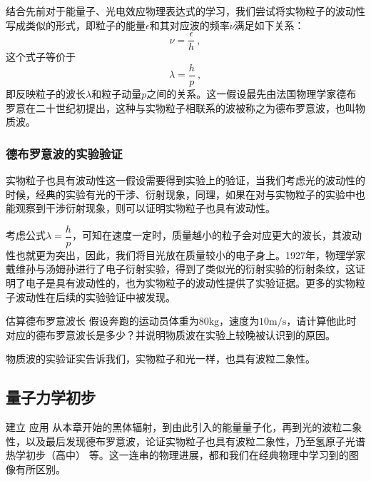 结合先前对于能量子、光电效应物理表达式的学习，我们尝试将实物粒子的波动性写成类似的形式，即粒子的能量$\epsilon$和其对应波的频率$\nu$满足如下关系：
$$\nu=\dfrac{\epsilon}{h}~,$$这个式子等价于$$\lambda=\dfrac{h}{p}~,$$即反映粒子的波长$\lambda$和粒子动量$p$之间的关系。这一假设最先由法国物理学家德布罗意在二十世纪初提出，这种与实物粒子相联系的波被称之为德布罗意波，也叫物质波。

\subsubsection{德布罗意波的实验验证}
实物粒子也具有波动性这一假设需要得到实验上的验证，当我们考虑光的波动性的时候，经典的实验有光的干涉、衍射现象，同理，如果在对与实物粒子的实验中也能观察到干涉衍射现象，则可以证明实物粒子也具有波动性。

考虑公式$\lambda=\dfrac{h}{p}$，可知在速度一定时，质量越小的粒子会对应更大的波长，其波动性也就更为突出，因此，我们将目光放在质量较小的电子身上。1927年，物理学家戴维孙与汤姆孙进行了电子衍射实验，得到了类似光的衍射实验的衍射条纹，这证明了电子是具有波动性的，也为实物粒子的波动性提供了实验证据。更多的实物粒子波动性在后续的实验验证中被发现。

\begin{exercise}{估算德布罗意波长}
假设奔跑的运动员体重为$80\mathrm{kg}$，速度为$10\mathrm{m/s}$，请计算他此时对应的德布罗意波长是多少？并说明物质波在实验上较晚被认识到的原因。
\end{exercise}

物质波的实验证实告诉我们，实物粒子和光一样，也具有波粒二象性。
\subsection{量子力学初步}
建立 应用
从本章开始的黑体辐射，到由此引入的能量量子化，再到光的波粒二象性，以及最后发现德布罗意波，论证实物粒子也具有波粒二象性，乃至氢原子光谱热学初步（高中）
等。这一连串的物理进展，都和我们在经典物理中学习到的图像有所区别。
% 
% 
